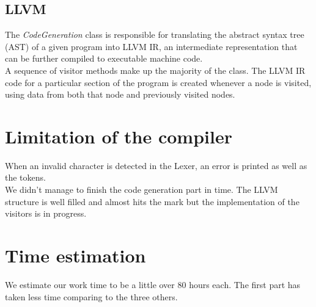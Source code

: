 \documentclass[11pt]{article}
\begin{document}
\subsection{LLVM}

The \textit{CodeGeneration} class is responsible for translating the abstract syntax tree (AST) of a given program into LLVM IR, an intermediate representation that can be further compiled to executable machine code.\\

A sequence of visitor methods make up the majority of the class. The LLVM IR code for a particular section of the program is created whenever a node is visited, using data from both that node and previously visited nodes.

\section{Limitation of the compiler}



When an invalid character is detected in the Lexer, an error is printed as well as the tokens.\\

We didn't manage to finish the code generation part in time. The LLVM structure is well filled and almost hits the mark but the implementation of the visitors is in progress.

\section{Time estimation}
We estimate our work time to be a little over 80 hours each. The first part has taken less time comparing to the three others.
\end{document}
